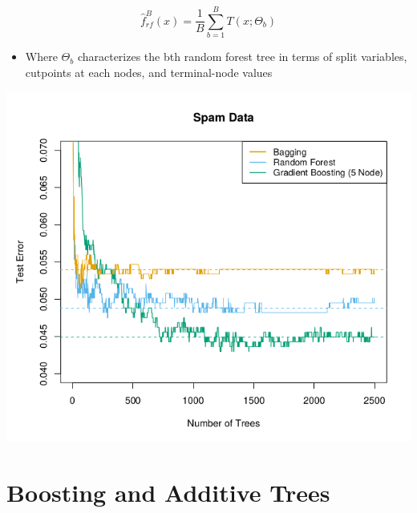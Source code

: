\documentclass[11pt]{article}
\begin{document}
\begin{equation}
  \hat f_{rf}^B(x) = \frac1B\sum_{b=1}^BT(x;\Theta_b)
\end{equation}
\begin{itemize}
\item Where \(\Theta_b\) characterizes the bth random forest tree in terms of split variables, cutpoints at each nodes, and terminal-node values
\end{itemize}

\begin{center}
\includegraphics[width=.9\linewidth]{Random forests/screenshot_2018-10-09_08-08-09.png}
\end{center}

\section{Boosting and Additive Trees}
\label{sec:orge24cf66}
\end{document}
